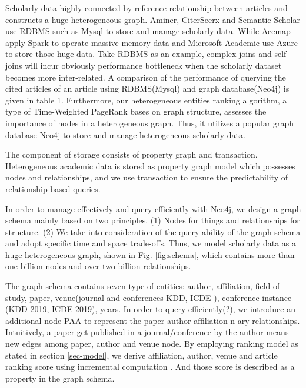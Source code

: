 \par
Scholarly data highly connected by reference relationship between articles and constructs a huge heterogeneous graph. Aminer, CiterSeerx and Semantic Scholar use RDBMS such as Mysql to store and manage scholarly data. While Acemap apply Spark to operate massive memory data and Microsoft Academic use Azure to store those huge data. Take RDBMS as an example, complex joins and self-joins will incur obviously performance bottleneck when the scholarly dataset becomes more inter-related. A comparison of the performance of querying the cited articles of an article using RDBMS(Mysql) and graph database(Neo4j) is given in table 1. Furthermore, our heterogeneous entities ranking algorithm, a type of Time-Weighted PageRank bases on graph structure, assesses the importance of nodes in a heterogeneous graph. Thus, it utilizes a popular graph database Neo4j to store and manage heterogeneous scholarly data.

\par
The component of storage consists of property graph and transaction. Heterogeneous academic data is stored as property graph model which possesses nodes and relationships, and we use transaction to ensure the predictability of relationship-based queries.

\par
In order to manage effectively and query efficiently with Neo4j, we design a graph schema mainly based on two principles. (1) Nodes for things and relationships for structure. (2) We take into consideration of the query ability of the graph schema and adopt specific time and space trade-offs. Thus, we model scholarly data as a huge heterogeneous graph, shown in Fig. \ref{fig:schema}, which contains more than one billion nodes and over two billion relationships.

\par
The graph schema contains seven type of entities: author, affiliation, field of study, paper, venue(journal and conferences \eg KDD, ICDE ), conference instance (\eg KDD 2019, ICDE 2019), years. In order to query efficiently(?), we introduce an additional node PAA to represent the paper-author-affiliation n-ary relationships. Intuitively, a paper get published in a journal/conference by the author means new edges among paper, author and venue node. By employing ranking model as stated in section \ref{sec-model}, we derive affiliation, author, venue and article ranking score using incremental computation \cite{ma2018query}. And those score is described as a property in the graph schema. 

